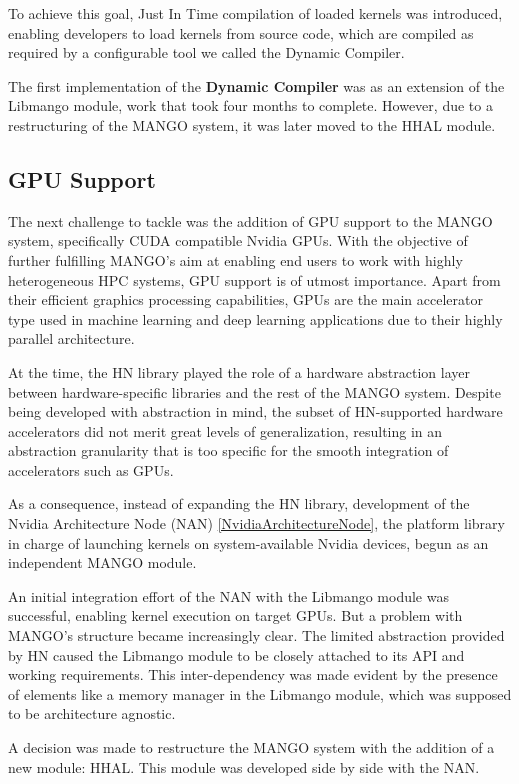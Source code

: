 To achieve this goal, Just In Time compilation of loaded kernels was introduced, enabling developers to load kernels from source code, which are compiled as required by a configurable tool we called the Dynamic Compiler.

The first implementation of the \textbf{Dynamic Compiler} was as an extension of the Libmango module, work that took four months to complete. However, due to a restructuring of the MANGO system, it was later moved to the HHAL module.

\subsection{GPU Support}

The next challenge to tackle was the addition of GPU support to the MANGO system, specifically CUDA compatible Nvidia GPUs. 
With the objective of further fulfilling MANGO's aim at enabling end users to work with highly heterogeneous HPC systems, GPU support is of utmost importance. Apart from their efficient graphics processing capabilities, GPUs are the main accelerator type used in machine learning and deep learning applications due to their highly parallel architecture.

At the time, the HN library played the role of a hardware abstraction layer between hardware-specific libraries and the rest of the MANGO system. Despite being developed with abstraction in mind, the subset of HN-supported hardware accelerators did not merit great levels of generalization, resulting in an abstraction granularity that is too specific for the smooth integration of accelerators such as GPUs.

As a consequence, instead of expanding the HN library, development of the Nvidia Architecture Node (NAN) \ref{NvidiaArchitectureNode}, the platform library in charge of launching kernels on system-available Nvidia devices, begun as an independent MANGO module.

An initial integration effort of the NAN with the Libmango module was successful, enabling kernel execution on target GPUs. 
But a problem with MANGO's structure became increasingly clear. The limited abstraction provided by HN caused the Libmango module to be closely attached to its API and working requirements. This inter-dependency was made evident by the presence of elements like a memory manager in the Libmango module, which was supposed to be architecture agnostic.

A decision was made to restructure the MANGO system with the addition of a new module: HHAL. This module was developed side by side with the NAN.

